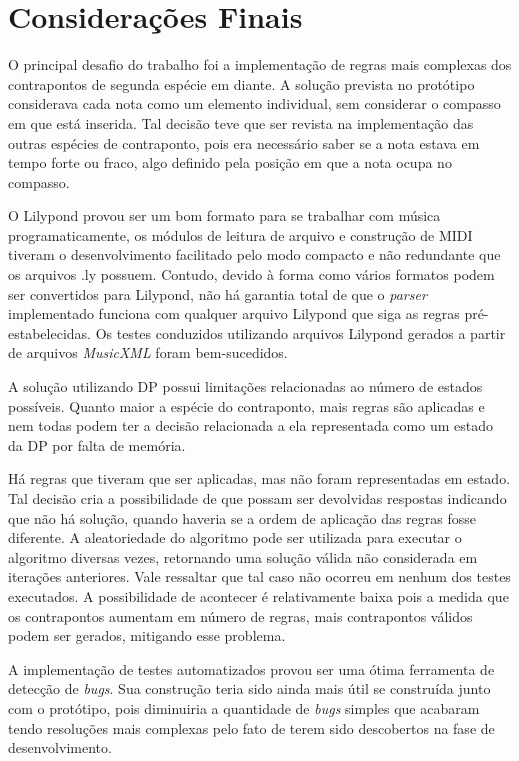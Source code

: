 \chapter[Considerações Finais]{Considerações Finais} \label{c4}

  O principal desafio do trabalho foi a implementação de regras mais complexas dos contrapontos de segunda espécie em diante. A solução prevista no protótipo considerava cada nota como um elemento individual, sem considerar o compasso em que está inserida. Tal decisão teve que ser revista na implementação das outras espécies de contraponto, pois era necessário saber se a nota estava em tempo forte ou fraco, algo definido pela posição em que a nota ocupa no compasso.

  O Lilypond provou ser um bom formato para se trabalhar com música programaticamente, os módulos de leitura de arquivo e construção de MIDI tiveram o desenvolvimento facilitado pelo modo compacto e não redundante que os arquivos .ly possuem. Contudo, devido à forma como vários formatos podem ser convertidos para Lilypond, não há garantia total de que o \textit{parser} implementado funciona com qualquer arquivo Lilypond que siga as regras pré-estabelecidas. Os testes conduzidos utilizando arquivos Lilypond gerados a partir de arquivos \textit{MusicXML} foram bem-sucedidos.

  A solução utilizando DP possui limitações relacionadas ao número de estados possíveis. Quanto maior a espécie do contraponto, mais regras são aplicadas e nem todas podem ter a decisão relacionada a ela representada como um estado da DP por falta de memória.

  Há regras que tiveram que ser aplicadas, mas não foram representadas em estado. Tal decisão cria a possibilidade de que possam ser devolvidas respostas indicando que não há solução, quando haveria se a ordem de aplicação das regras fosse diferente. A aleatoriedade do algoritmo pode ser utilizada para executar o algoritmo diversas vezes, retornando uma solução válida não considerada em iterações anteriores. Vale ressaltar que tal caso não ocorreu em nenhum dos testes executados. A possibilidade de acontecer é relativamente baixa pois a medida que os contrapontos aumentam em número de regras, mais contrapontos válidos podem ser gerados, mitigando esse problema.

  A implementação de testes automatizados provou ser uma ótima ferramenta de detecção de \textit{bugs}. Sua construção teria sido ainda mais útil se construída junto com o protótipo, pois diminuiria a quantidade de \textit{bugs} simples que acabaram tendo resoluções mais complexas pelo fato de terem sido descobertos na fase de desenvolvimento.

